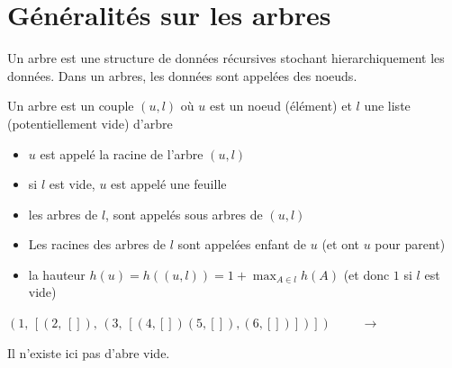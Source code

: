 
\section{Généralités sur les arbres}

Un arbre est une structure de données récursives stochant hierarchiquement les données. Dans un arbres, les données sont appelées des noeuds.

\begin{definition}[arbre]
	Un arbre est un couple $(u, l)$ où $u$ est un noeud (élément) et $l$ une liste (potentiellement vide) d'arbre 
	
	\begin{itemize}[label=$\bullet$]
		\item $u$ est appelé la racine de l'arbre $(u, l)$
		
		\item si $l$ est vide, $u$ est appelé une feuille
		
		\item les arbres de $l$, sont appelés sous arbres de $(u,l)$
		
		\item Les racines des arbres de $l$ sont appelées enfant de $u$ (et ont $u$ pour parent)
		
		\item la hauteur $h(u) = h((u,l)) = 1 + \max_{A\in l} h(A)$ (et donc $1$ si $l$ est vide)
	\end{itemize}
\end{definition}

\begin{example}
	\label{10-ex1}
	$(1, \, [(2, \, []), \, (3, \, [(4,[])  (5, []), (6, [])])])$ $\qquad \longrightarrow \qquad$ 
\end{example}

\begin{rem}
	Il n'existe ici pas d'abre vide.
\end{rem}

